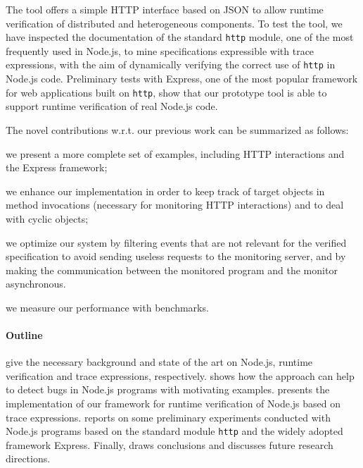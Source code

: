 The tool offers a simple HTTP interface based on JSON to allow runtime verification of
distributed and heterogeneous components.
%
To test the tool, we have inspected the documentation of the standard \lstinline{http} module, one of the most frequently used 
in Node.js, to mine specifications expressible with trace expressions, with the aim of dynamically verifying
the correct use of \lstinline{http} in Node.js code.
Preliminary tests with Express, one of the most popular framework for web applications built on \lstinline{http}, show
that our prototype tool is able to support runtime verification of real Node.js code.

The novel contributions w.r.t. our previous work \cite{TowardsIoT17} can be summarized as follows:
\begin{enumerate*}[label=(\alph*)]
	\item we present a more complete set of examples, including HTTP interactions and the Express framework;
	\item we enhance our implementation in order to keep track of target objects in method invocations (necessary for monitoring HTTP interactions) and to deal with cyclic objects;
	\item we optimize our system by filtering events that are not relevant for the verified specification to avoid sending useless requests to the monitoring server, and by making the communication between the monitored program and the monitor asynchronous.
	\item we measure our performance with benchmarks.
\end{enumerate*}

\paragraph{Outline}
 give the necessary background and state of the art on Node.js, runtime verification and trace expressions, respectively.
 shows how the approach can help to detect bugs in Node.js programs with motivating examples.
 presents the implementation of our framework for runtime verification of Node.js based on trace expressions.
 reports on some preliminary experiments conducted with Node.js programs based on the standard module
\lstinline{http} and the widely adopted framework Express.
Finally,  draws conclusions and discusses future research directions.
